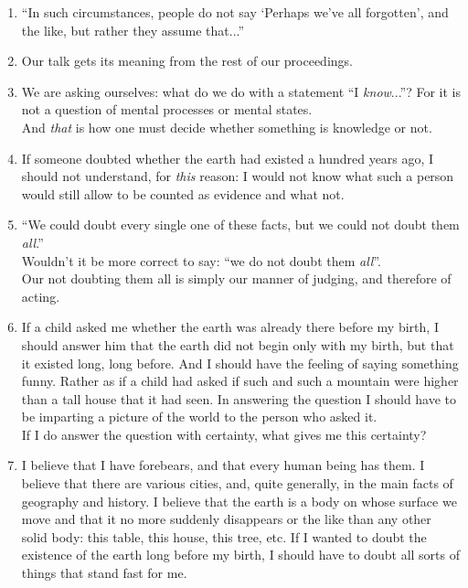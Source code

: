 \documentclass{book}
\begin{document}
\begin{enumerate}
\item
``In such circumstances, people do not say `Perhaps we've all forgotten', and
the like, but rather they assume that...''

\item
Our talk gets its meaning from the rest of our proceedings.

\item
We are asking ourselves: what do we do with a statement ``I \emph{know}...''?
For it is not a question of mental processes or mental states. \\
And \emph{that} is how one must decide whether something is knowledge or not.

\item
If someone doubted whether the earth had existed a hundred years ago, I should
not understand, for \emph{this} reason: I would not know what such a person
would still allow to be counted as evidence and what not.

\item
``We could doubt every single one of these facts, but we could not doubt them
\emph{all}.'' \\
Wouldn't it be more correct to say: ``we do not doubt them \emph{all}''. \\
Our not doubting them all is simply our manner of judging, and therefore of
acting.

\item
If a child asked me whether the earth was already there before my birth, I
should answer him that the earth did not begin only with my birth, but that it
existed long, long before. And I should have the feeling of saying something
funny. Rather as if a child had asked if such and such a mountain were higher
than a tall house that it had seen. In answering the question I should have to
be imparting a picture of the world to the person who asked it. \\
If I do answer the question with certainty, what gives me this certainty?

\item
I believe that I have forebears, and that every human being has them. I believe
that there are various cities, and, quite generally, in the main facts of
geography and history. I believe that the earth is a body on whose surface we
move and that it no more suddenly disappears or the like than any other solid
body: this table, this house, this tree, etc. If I wanted to doubt the
existence of the earth long before my birth, I should have to doubt all sorts
of things that stand fast for me.


\end{enumerate}
\end{document}
